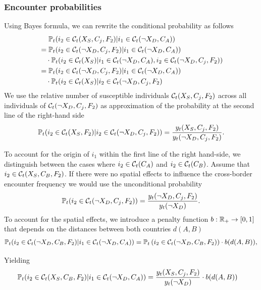 \subsubsection{Encounter probabilities}
\label{A:meeting_prob}
Using Bayes formula, we can rewrite the conditional probability as follows
\begin{align}
\label{eq:cond_meeting_prob}
&\quad \   \mathbb{P}_t(i_2 \in \mathcal{C}_t(X_S, C_j, F_2)|i_1 \in \mathcal{C}_t(\neg X_D, C_A)) \\ &= \mathbb{P}_t(i_2 \in \mathcal{C}_t(\neg X_D, C_j, F_2) | i_1 \in \mathcal{C}_t(\neg X_D, C_A) )  \notag \\
& \quad \cdot \mathbb{P}_t(i_2 \in \mathcal{C}_t(X_S) | i_1 \in \mathcal{C}_t(\neg X_D, C_A), i_2 \in \mathcal{C}_t(\neg X_D, C_j, F_2) ) \notag \\
&= \mathbb{P}_t(i_2 \in \mathcal{C}_t(\neg X_D, C_j, F_2) | i_1 \in \mathcal{C}_t(\neg X_D, C_A) )  \notag \\
& \quad \cdot \mathbb{P}_t(i_2 \in \mathcal{C}_t(X_S)|i_2 \in \mathcal{C}_t(\neg X_D, C_j, F_2)  \notag
\end{align} 
We use the relative number of susceptible individuals $\mathcal{C}_t(X_S, C_j, F_2)$ across all individuals of $\mathcal{C}_t(\neg X_D, C_j, F_2)$ as approximation of the probability at the second line of the right-hand side 
\begin{align}
 \mathbb{P}_t(i_2 \in \mathcal{C}_t(X_S, F_2)|i_2 \in \mathcal{C}_t(\neg X_D, C_j, F_2) ) = \frac{y_t(X_S, C_j, F_2)}{y_t(\neg X_D, C_j, F_2)}.
\end{align}

To account for the origin of $i_1$ within the first line of the right hand-side, we distinguish between the cases where $i_2 \in \mathcal{C}_t(C_A)$ and $i_2 \in \mathcal{C}_t(C_B)$. Assume that $i_2 \in \mathcal{C}_t(X_S, C_B, F_2)$. If there were no spatial effects to influence the cross-border encounter frequency we would use the unconditional probability 
\begin{align}
\mathbb{P}_t(i_2 \in \mathcal{C}_t(\neg X_D, C_j, F_2)) = \frac{y_t(\neg X_D, C_j, F_2)}{ y_t(\neg X_D)}.   
\end{align}
To account for the spatial effects, we introduce a penalty function $b: \mathbb{R}_+ \to [0,1]$ that depends on the distances between both countries $d(A, B)$
\begin{align}
\label{eq:prob_cross_border}
\mathbb{P}_t(i_2 \in \mathcal{C}_t(\neg X_D, C_B, F_2) | i_1 \in \mathcal{C}_t(\neg X_D, C_A) ) = \mathbb{P}_t\left(i_2 \in \mathcal{C}_t(\neg X_D, C_B, F_2)\right) \cdot b(d(A, B)),
\end{align}

Yielding
\begin{align}
\label{eq:cond_meeting_prob_b}
\mathbb{P}_t(i_2 \in \mathcal{C}_t(X_S, C_B, F_2)|i_1 \in \mathcal{C}_t(\neg X_D, C_A)) &= \frac{y_t(X_S, C_j, F_2)}{y_t(\neg X_D)} \cdot b(d(A, B))
\end{align} 


